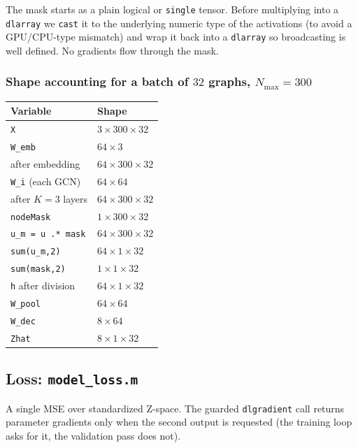 \documentclass[11pt]{article}
\begin{document}
The mask starts as a plain logical or \texttt{single} tensor. Before
multiplying into a \texttt{dlarray} we \texttt{cast} it to the underlying
numeric type of the activations (to avoid a GPU/CPU-type mismatch) and wrap
it back into a \texttt{dlarray} so broadcasting is well defined. No
gradients flow through the mask.

\subsubsection*{Shape accounting for a batch of $32$ graphs, $N_{\max}=300$}

\begin{center}
\begin{tabular}{ll}
\toprule
Variable & Shape \\
\midrule
\texttt{X}                            & $3\times 300\times 32$ \\
\texttt{W\_emb}                       & $64\times 3$ \\
after embedding                       & $64\times 300\times 32$ \\
\texttt{W\_i} (each GCN)              & $64\times 64$ \\
after $K=3$ layers                    & $64\times 300\times 32$ \\
\texttt{nodeMask}                     & $1\times 300\times 32$ \\
\texttt{u\_m = u .* mask}             & $64\times 300\times 32$ \\
\texttt{sum(u\_m,2)}                  & $64\times 1\times 32$ \\
\texttt{sum(mask,2)}                  & $1\times 1\times 32$ \\
\texttt{h} after division             & $64\times 1\times 32$ \\
\texttt{W\_pool}                      & $64\times 64$ \\
\texttt{W\_dec}                       & $8\times 64$ \\
\texttt{Zhat}                         & $8\times 1\times 32$ \\
\bottomrule
\end{tabular}
\end{center}

\subsection{Loss: \texttt{model\_loss.m}}

A single MSE over standardized Z-space. The guarded \texttt{dlgradient} call
returns parameter gradients only when the second output is requested (the
training loop asks for it, the validation pass does not).
\end{document}
